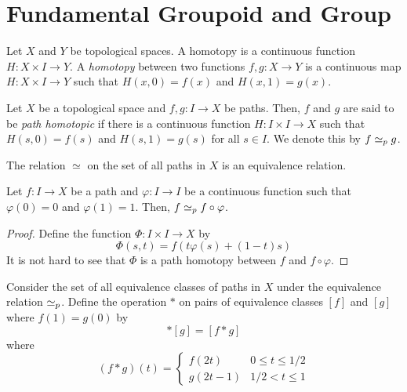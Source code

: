 \section{Fundamental Groupoid and Group}

\begin{definition}[Homotopy]
    Let $X$ and $Y$ be topological spaces. A homotopy is a continuous function $H: X\times I\to Y$. A \textit{homotopy} between two functions $f,g: X\to Y$ is a continuous map $H: X\times I\to Y$ such that $H(x,0) = f(x)$ and $H(x, 1) = g(x)$.
\end{definition}

\begin{definition}
    Let $X$ be a topological space and $f,g: I\to X$ be paths. Then, $f$ and $g$ are said to be \textit{path homotopic} if there is a continuous function $H: I\times I\to X$ such that $H(s,0) = f(s)$ and $H(s,1) = g(s)$ for all $s\in I$. We denote this by $f\simeq_p g$.
\end{definition}

\begin{proposition}
    The relation $\simeq$ on the set of all paths in $X$ is an equivalence relation.
\end{proposition}

\begin{proposition}
    Let $f: I\to X$ be a path and $\varphi: I\to I$ be a continuous function such that $\varphi(0) = 0$ and $\varphi(1) = 1$. Then, $f\simeq_p f\circ\varphi$.
\end{proposition}
\begin{proof}
    Define the function $\Phi: I\times I\to X$ by 
    \begin{equation*}
        \Phi(s,t) = f(t\varphi(s) + (1 - t)s)
    \end{equation*}
    It is not hard to see that $\Phi$ is a path homotopy between $f$ and $f\circ\varphi$.
\end{proof}

Consider the set of all equivalence classes of paths in $X$ under the equivalence relation $\simeq_p$. Define the operation $*$ on pairs of equivalence classes $[f]$ and $[g]$ where $f(1) = g(0)$ by 
\begin{equation*}
    [f]*[g] = [f*g]
\end{equation*}
where 
\begin{equation*}
    (f*g)(t) =
    \begin{cases}
        f(2t) & 0\le t\le 1/2\\
        g(2t - 1) & 1/2 < t\le 1
    \end{cases}
\end{equation*}

